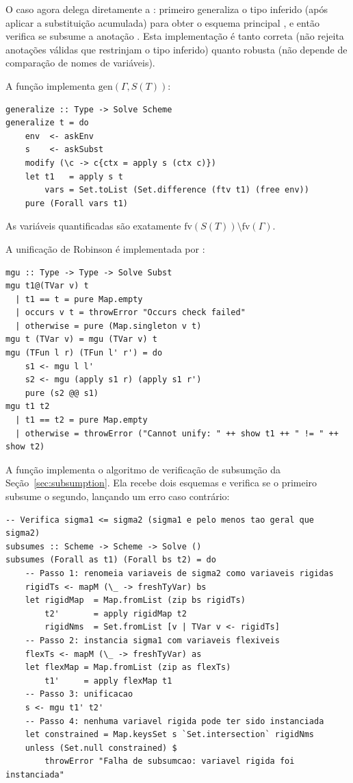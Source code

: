   O caso  agora delega diretamente a
  : primeiro generaliza o tipo inferido 
  (após aplicar a substituição acumulada) para obter o esquema principal
  , e então verifica se  subsume a
  anotação .  Esta implementação é tanto correta (não
  rejeita anotações válidas que restrinjam o tipo inferido) quanto
  robusta (não depende de comparação de nomes de variáveis).

  A função  implementa
  \(\mathrm{gen}(\Gamma, S(T))\):

\begin{verbatim}
generalize :: Type -> Solve Scheme
generalize t = do
    env  <- askEnv
    s    <- askSubst
    modify (\c -> c{ctx = apply s (ctx c)})
    let t1   = apply s t
        vars = Set.toList (Set.difference (ftv t1) (free env))
    pure (Forall vars t1)
\end{verbatim}

  As variáveis quantificadas são exatamente
  \(\mathrm{fv}(S(T)) \setminus \mathrm{fv}(\Gamma)\).

  A unificação de Robinson é implementada por :

\begin{verbatim}
mgu :: Type -> Type -> Solve Subst
mgu t1@(TVar v) t
  | t1 == t = pure Map.empty
  | occurs v t = throwError "Occurs check failed"
  | otherwise = pure (Map.singleton v t)
mgu t (TVar v) = mgu (TVar v) t
mgu (TFun l r) (TFun l' r') = do
    s1 <- mgu l l'
    s2 <- mgu (apply s1 r) (apply s1 r')
    pure (s2 @@ s1)
mgu t1 t2
  | t1 == t2 = pure Map.empty
  | otherwise = throwError ("Cannot unify: " ++ show t1 ++ " != " ++ show t2)
\end{verbatim}

  A função  implementa o algoritmo de verificação de
  subsumção da Seção~\ref{sec:subsumption}. Ela recebe dois esquemas e
  verifica se o primeiro subsume o segundo, lançando um erro caso contrário:

\begin{verbatim}
-- Verifica sigma1 <= sigma2 (sigma1 e pelo menos tao geral que sigma2)
subsumes :: Scheme -> Scheme -> Solve ()
subsumes (Forall as t1) (Forall bs t2) = do
    -- Passo 1: renomeia variaveis de sigma2 como variaveis rigidas
    rigidTs <- mapM (\_ -> freshTyVar) bs
    let rigidMap  = Map.fromList (zip bs rigidTs)
        t2'       = apply rigidMap t2
        rigidNms  = Set.fromList [v | TVar v <- rigidTs]
    -- Passo 2: instancia sigma1 com variaveis flexiveis
    flexTs <- mapM (\_ -> freshTyVar) as
    let flexMap = Map.fromList (zip as flexTs)
        t1'     = apply flexMap t1
    -- Passo 3: unificacao
    s <- mgu t1' t2'
    -- Passo 4: nenhuma variavel rigida pode ter sido instanciada
    let constrained = Map.keysSet s `Set.intersection` rigidNms
    unless (Set.null constrained) $
        throwError "Falha de subsumcao: variavel rigida foi instanciada"
\end{verbatim}

